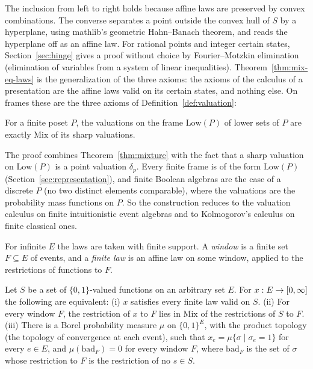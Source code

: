 \noindent
The inclusion from left to right holds because affine laws are preserved
by convex combinations. The converse
separates a point outside the convex hull of $S$ by a hyperplane, using
\textsf{mathlib}'s geometric Hahn--Banach theorem, and reads the
hyperplane off as an affine law. For rational points and integer certain
states, Section~\ref{sec:hinge} gives a proof without choice by
Fourier--Motzkin elimination (elimination of variables from a system
of linear inequalities).
Theorem~\ref{thm:mix-eq-laws} is the generalization of the three axioms:
the axioms of the calculus of a presentation are the affine laws valid
on its certain states, and nothing else. On frames these are the three
axioms of Definition~\ref{def:valuation}:

\begin{theorem}
\label{thm:frame-recipe}
For a finite poset $P$, the valuations on the frame
$\mathrm{Low}(P)$ of lower sets of $P$ are exactly $\mathrm{Mix}$ of its
sharp valuations.
\end{theorem}

\noindent
The proof combines Theorem~\ref{thm:mixture} with the fact that a sharp
valuation on $\mathrm{Low}(P)$ is a point valuation
$\delta_p$. Every finite frame is of
the form $\mathrm{Low}(P)$ (Section~\ref{sec:representation}), and finite
Boolean algebras are the case of a discrete $P$ (no two distinct
elements comparable), where the valuations are the probability mass functions
on $P$. So the construction reduces to the valuation calculus on finite
intuitionistic event algebras and to Kolmogorov's calculus on finite
classical ones.

For infinite $E$ the laws are taken with finite support. A
\emph{window} is a finite set $F \subseteq E$ of events, and a
\emph{finite law} is an affine law on some window, applied to the
restrictions of functions to $F$.

\begin{theorem}
\label{thm:barycenter}
Let $S$ be a set of $\{0,1\}$-valued functions on an arbitrary set $E$.
For $x : E \to [0,\infty]$ the following are equivalent:
(i) $x$ satisfies every finite law valid on $S$.
(ii) For every window $F$, the restriction of $x$ to $F$ lies
in $\mathrm{Mix}$ of the restrictions of $S$ to $F$.
(iii) There is a Borel probability measure $\mu$ on $\{0,1\}^E$, with
the product topology (the topology of convergence at each event), such
that
$x_e = \mu\{\sigma \mid \sigma_e = 1\}$ for every $e \in E$, and
$\mu(\mathrm{bad}_F) = 0$ for every window $F$, where $\mathrm{bad}_F$ is
the set of $\sigma$ whose restriction to $F$ is the restriction of no
$s \in S$.
\end{theorem}

